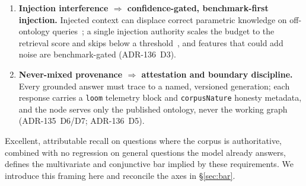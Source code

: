 \documentclass[10pt,twocolumn]{article}
\begin{document}
\begin{enumerate}[topsep=3pt,itemsep=2pt,leftmargin=1.5em]
\item \textbf{Injection interference $\Rightarrow$ confidence-gated, benchmark-first injection.}
Injected context can displace correct parametric knowledge on off-ontology
queries~\cite{shi2023distracted,yoran2024robust,longpre2021entity}; a single injection authority
scales the budget to the retrieval score and skips below a threshold~\cite{mallen2023trust}, and
features that could add noise are benchmark-gated (ADR-136~D3).
\item \textbf{Never-mixed provenance $\Rightarrow$ attestation and boundary discipline.} Every
grounded answer must trace to a named, versioned generation; each response carries a \texttt{loom}
telemetry block and \texttt{corpusNature} honesty metadata, and the node serves only the published
ontology, never the working graph (ADR-135~D6/D7; ADR-136~D5).
\end{enumerate}

Excellent, attributable recall on questions where the corpus is authoritative, combined with no regression on general questions the model already answers, defines the multivariate and conjunctive bar implied by these requirements. We introduce this framing here and reconcile the axes in \S\ref{sec:bar}.
\end{document}
